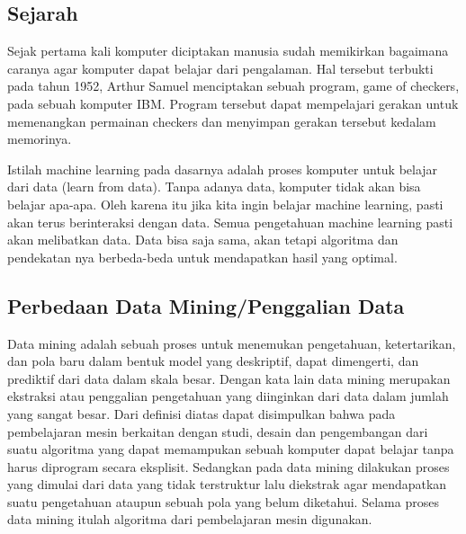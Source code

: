 \subsection{Sejarah}
 Sejak pertama kali komputer diciptakan manusia sudah memikirkan bagaimana caranya agar komputer dapat belajar dari pengalaman. Hal tersebut terbukti pada tahun 1952, Arthur Samuel menciptakan sebuah program, game of checkers, pada sebuah komputer IBM. Program tersebut dapat mempelajari gerakan untuk memenangkan permainan checkers dan menyimpan gerakan tersebut kedalam memorinya.
\par Istilah machine learning pada dasarnya adalah proses komputer untuk belajar dari data (learn from data). Tanpa adanya data, komputer tidak akan bisa belajar apa-apa. Oleh karena itu jika kita ingin belajar machine learning, pasti akan terus berinteraksi dengan data. Semua pengetahuan machine learning pasti akan melibatkan data. Data bisa saja sama, akan tetapi algoritma dan pendekatan nya berbeda-beda untuk mendapatkan hasil yang optimal.

\subsection{Perbedaan Data Mining/Penggalian Data}
 Data mining adalah sebuah proses untuk menemukan pengetahuan, ketertarikan, dan pola baru dalam bentuk model yang deskriptif, dapat dimengerti, dan prediktif dari data dalam skala besar. Dengan kata lain data mining merupakan ekstraksi atau penggalian pengetahuan yang diinginkan dari data dalam jumlah yang sangat besar.
Dari definisi diatas dapat disimpulkan bahwa pada pembelajaran mesin berkaitan dengan studi, desain dan pengembangan dari suatu algoritma yang dapat memampukan sebuah komputer dapat belajar tanpa harus diprogram secara eksplisit. Sedangkan pada data mining dilakukan proses yang dimulai dari data yang tidak terstruktur lalu diekstrak agar mendapatkan suatu pengetahuan ataupun sebuah pola yang belum diketahui. Selama proses data mining itulah algoritma dari pembelajaran mesin digunakan.


